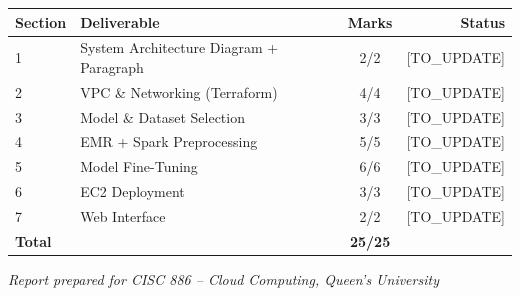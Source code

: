 \documentclass[11pt,a4paper]{article}
\begin{document}
\begin{table}[H]
\centering
\begin{tabular}{@{}llcr@{}}
\toprule
\textbf{Section} & \textbf{Deliverable} & \textbf{Marks} & \textbf{Status} \\
\midrule
1 & System Architecture Diagram + Paragraph & 2/2 & [TO\_UPDATE] \\
2 & VPC \& Networking (Terraform) & 4/4 & [TO\_UPDATE] \\
3 & Model \& Dataset Selection & 3/3 & [TO\_UPDATE] \\
4 & EMR + Spark Preprocessing & 5/5 & [TO\_UPDATE] \\
5 & Model Fine-Tuning & 6/6 & [TO\_UPDATE] \\
6 & EC2 Deployment & 3/3 & [TO\_UPDATE] \\
7 & Web Interface & 2/2 & [TO\_UPDATE] \\
\midrule
\textbf{Total} & & \textbf{25/25} & \\
\bottomrule
\end{tabular}
\end{table}

\vfill
\begin{center}
\textit{Report prepared for CISC 886 -- Cloud Computing, Queen's University}
\end{center}
\end{document}
